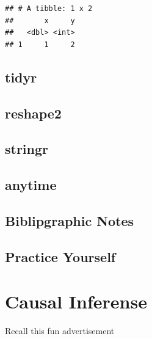 \documentclass[]{book}
\newenvironment{Shaded}{\begin{snugshade}}{\end{snugshade}}
\newcommand{\KeywordTok}[1]{\textcolor[rgb]{0.13,0.29,0.53}{\textbf{#1}}}
\newcommand{\DataTypeTok}[1]{\textcolor[rgb]{0.13,0.29,0.53}{#1}}
\newcommand{\StringTok}[1]{\textcolor[rgb]{0.31,0.60,0.02}{#1}}
\newcommand{\CommentTok}[1]{\textcolor[rgb]{0.56,0.35,0.01}{\textit{#1}}}
\newcommand{\OperatorTok}[1]{\textcolor[rgb]{0.81,0.36,0.00}{\textbf{#1}}}
\newcommand{\NormalTok}[1]{#1}
\theoremstyle{definition}
\theoremstyle{definition}
\theoremstyle{definition}
\theoremstyle{remark}
\begin{document}
\begin{Shaded}
\end{Shaded}

\begin{verbatim}
## # A tibble: 1 x 2
##       x     y
##   <dbl> <int>
## 1     1     2
\end{verbatim}

\section{tidyr}\label{tidyr}

\section{reshape2}\label{reshape2}

\section{stringr}\label{stringr}

\section{anytime}\label{anytime}

\section{Biblipgraphic Notes}\label{biblipgraphic-notes-1}

\section{Practice Yourself}\label{practice-yourself-19}

\chapter{Causal Inferense}\label{causality}

Recall this fun advertisement
\end{document}
